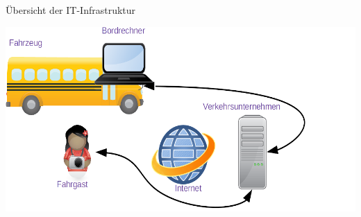
\begin{frame}{Übersicht der IT-Infrastruktur}
  \begin{center}
    \includegraphics[width=1.1\textwidth]{agentur-landmobil-june-09.de/public-transport-simple-06-04-2021.png}
  \end{center}
\end{frame}
